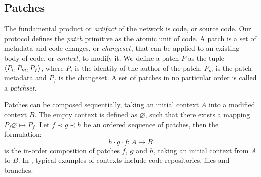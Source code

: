 \subsection{Patches}
\label{patches}

The fundamental product or \emph{artifact} of the \oscoin{} network is code, or
source code. Our protocol defines the \emph{patch} primitive as the atomic unit
of code. A patch is a set of metadata and code changes, or \emph{changeset},
that can be applied to an existing body of code, or \emph{context}, to modify
it. We define a patch $P$ as the tuple $\langle P_i, P_m, P_f \rangle$, where $P_i$ is
the identity of the author of the patch, $P_m$ is the patch metadata and $P_f$
is the changeset. A set of patches in no particular order is called a
\emph{patchset}.

Patches can be composed sequentially, taking an initial context $A$ into
a modified context $B$. The empty context is defined as $\varnothing$, such
that there exists a mapping $P_f \varnothing \mapsto P_f$. Let $f \prec g
\prec h$ be an ordered sequence of patches, then the formulation:
\[
    h \cdot g \cdot f : A \to B
\]
is the in-order composition of patches $f$, $g$ and $h$, taking an initial
context from $A$ to $B$. In \oscoin{}, typical examples of contexts include
code repositories, files and branches.








